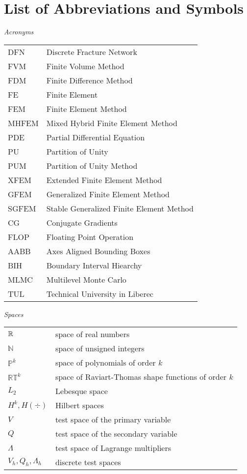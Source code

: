 \section*{List of Abbreviations and Symbols}

\noindent\emph{Acronyms}
\vspace{0.5cm}

\begin{tabularx}{0.9\linewidth}{@{}lX@{}}
DFN & Discrete Fracture Network \\
FVM & Finite Volume Method \\
FDM & Finite Difference Method \\
FE & Finite Element \\
FEM & Finite Element Method \\
MHFEM & Mixed Hybrid Finite Element Method \\
PDE & Partial Differential Equation \\
PU & Partition of Unity \\
PUM & Partition of Unity Method \\
XFEM & Extended Finite Element Method \\
GFEM & Generalized Finite Element Method \\
SGFEM & Stable Generalized Finite Element Method \\
CG & Conjugate Gradients \\
FLOP & Floating Point Operation \\
AABB & Axes Aligned Bounding Boxes \\
BIH & Boundary Interval Hiearchy \\
MLMC & Multilevel Monte Carlo\\
TUL & Technical University in Liberec
\end{tabularx}
\vspace{1cm}

\noindent\emph{Spaces}
\vspace{0.5cm}

\begin{tabularx}{0.9\linewidth}{@{}lX@{}}
$\mathbb{R}$ & space of real numbers  \\
$\mathbb N$ & space of unsigned integers \\
$\mathbb P^k$ & space of polynomials of order $k$  \\
$\mathbb {RT}^k$ & space of Raviart-Thomas shape functions of order $k$  \\
$L_2$ & Lebesque space \\
$H^k, H(\div)$ & Hilbert spaces \\
$V$ & test space of the primary variable \\
$Q$ & test space of the secondary variable \\
$\Lambda$ & test space of Lagrange multipliers\\
$V_h, Q_h, \Lambda_h$ & discrete test spaces\\
\end{tabularx}
\pagebreak

